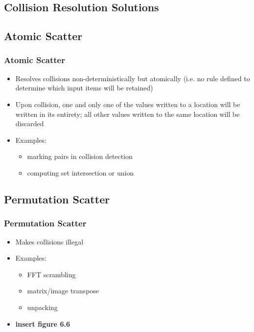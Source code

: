 \documentclass[xcolor=dvipsnames]{beamer}
\begin{document}
	\subsection{Collision Resolution Solutions}
	
		\subsection*{Atomic Scatter}
		\begin{frame} \frametitle{Atomic Scatter}
			\begin{itemize}
				\item Resolves collisions non-deterministically but atomically 
                (i.e. no rule defined to determine which input items will be 
                retained)
				\item Upon collision, one and only one of the values written to
                a location will be written in its entirety; all other values 
                written to the same location will be discarded
				\item Examples:
					\begin{itemize}
						\item marking pairs in collision detection
						\item computing set intersection or union 
					\end{itemize}
			\end{itemize}
		\end{frame}
	
		\subsection*{Permutation Scatter}
		\begin{frame} \frametitle{Permutation Scatter}
			\begin{itemize}
				\item Makes collisions illegal
				\item Examples:
					\begin{itemize}
						\item FFT scrambling
						\item matrix/image transpose
						\item unpacking
					\end{itemize}
				\item \textbf{insert figure 6.6}
			\end{itemize}
		\end{frame}
	
\end{document}
